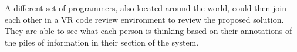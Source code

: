 \documentclass[conference]{IEEEtran}
\begin{document}
A different set of programmers, also located around the world, could then join each other in a VR code review environment to review the proposed solution.
They are able to see what each person is thinking based on their annotations of the piles of information in their section of the system.






\end{document}
